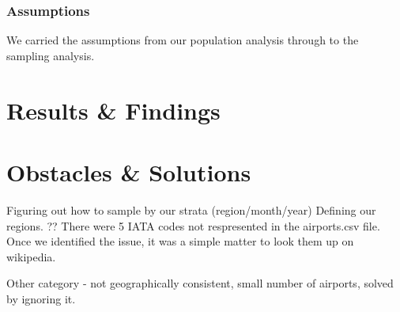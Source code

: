 \documentclass{article}
\begin{document}
\subsubsection{Assumptions}
We carried the assumptions from our population analysis through to the sampling analysis.


\section{Results \& Findings}






\section{Obstacles \& Solutions}
Figuring out how to sample by our strata (region/month/year)
Defining our regions.
??
There were 5 IATA codes not respresented in the airports.csv file. Once we identified the issue, it was a simple matter to look them up on wikipedia. 

Other category - not geographically consistent, small number of airports, solved by ignoring it.
\end{document}
